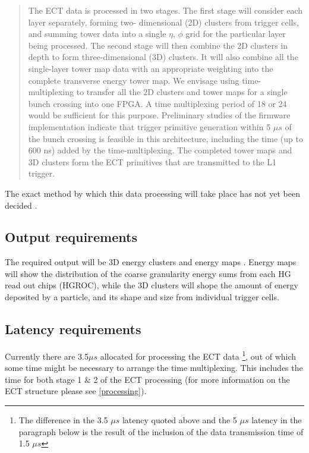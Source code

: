 \documentclass[12 pt]{article}
\begin{document}
			\begin{quotation}
				The ECT data is processed in two stages. The first stage will consider each layer separately, forming two- dimensional (2D) clusters from trigger cells, and summing tower data into a single $\eta$, $\phi$ grid for the particular layer being processed. The second stage will then combine the 2D clusters in depth to form three-dimensional (3D) clusters. It will also combine all the single-layer tower map data with an appropriate weighting into the complete transverse energy tower map. We envisage using time-multiplexing to transfer all the 2D clusters and tower maps for a single bunch crossing into one FPGA. A time multiplexing period of 18 or 24 would be sufficient for this purpose. Preliminary studies of the firmware implementation indicate that trigger primitive generation within 5 $\mu s$ of the bunch crossing is feasible in this architecture, including the time (up to 600 ns) added by the time-multiplexing. The completed tower maps and 3D clusters form the ECT primitives that are transmitted to the L1 trigger.
			\end{quotation}

			The exact method by which this data processing will take place has not yet been decided \cite{itdr,TDR}. 

		\subsection{Output requirements}
			The required output will be 3D energy clusters and energy maps \cite{itdr}. Energy maps will show the distribution of the coarse granularity energy sums from each HG read out chips (HGROC), while the 3D clusters will shope the amount of energy deposited by a particle, and its shape and size from individual trigger cells.

		\subsection{Latency requirements}
			Currently there are 3.5$\mu s$ allocated for processing the ECT data \footnote{The difference in the 3.5 $\mu s$ latency quoted above and the 5 $\mu s$ latency in the paragraph below is the result of the inclusion of the data transmission time of 1.5 $\mu s$}, out of which some time might be necessary to arrange the time multiplexing. This includes the time for both stage 1 \& 2 of the ECT processing (for more information on the ECT structure please see \ref{processing}). 
		
\end{document}
